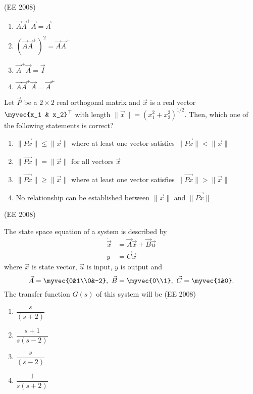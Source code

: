 \hfill (EE 2008)
\begin{multicols}{4}
\begin{enumerate}
    \item $\vec{A}\vec{A}^{+}\vec{A} = \vec{A}$
    \item $(\vec{A}\vec{A}^{+})^2 = \vec{A}\vec{A}^{+}$
    \item $\vec{A}^{+}\vec{A} = \vec{I}$
    \item $\vec{A} \vec{A}^{+}\vec{A} = \vec{A}^{+}$
\end{enumerate}
\end{multicols}
%
\item Let $\vec{P}$ be a $2\times 2$ real orthogonal matrix and $\vec{x}$ is a real vector $\myvec{x_1 & x_2}^{\top}$ with length $\|\vec{x}\| = (x_1^2+x_2^2)^{1/2}$. Then, which one of the following statements is correct?
\begin{enumerate}
    \item $\|\vec{Px}\| \le \|\vec{x}\|$ where at least one vector satisfies $\|\vec{Px}\| < \|\vec{x}\|$
    \item $\|\vec{Px}\| = \|\vec{x}\|$ for all vectors $\vec{x}$
    \item $\|\vec{Px}\| \ge \|\vec{x}\|$ where at least one vector satisfies $\|\vec{Px}\| > \|\vec{x}\|$
    \item No relationship can be established between $\|\vec{x}\|$ and $\|\vec{Px}\|$
\end{enumerate}
\hfill (EE 2008)
\item 
The state space equation of a system is described by
\begin{align*}
	\dot{\vec{x}} &= \vec{A}\vec{x} + \vec{B}\vec{u}\\
	y &= \vec{C}\vec{x}
\end{align*}
where $\vec{x}$ is state vector, $\vec{u}$ is input, ${y}$ is output and
$$
\vec{A}=\myvec{0&1\\0&-2},\
\vec{B}=\myvec{0\\1},\
\vec{C}=\myvec{1&0}.
	$$
The transfer function $G(s)$ of this system will be
\hfill (EE 2008) 
\begin{multicols}{4}
\begin{enumerate}
    \item $\dfrac{s}{(s+2)}$
    \item $\dfrac{s+1}{s(s-2)}$
    \item $\dfrac{s}{(s-2)}$
    \item $\dfrac{1}{s(s+2)}$
\end{enumerate}
\end{multicols}

